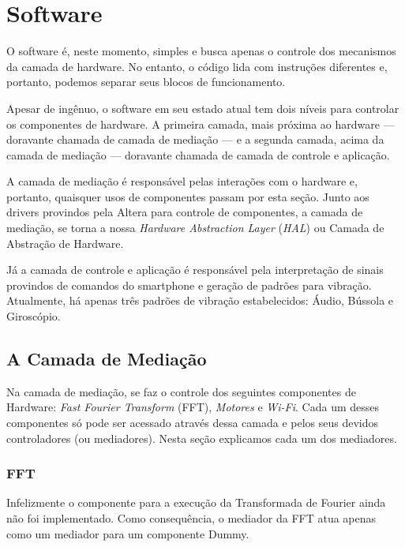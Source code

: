 \documentclass{sig-alternate-05-2015}
\begin{document}
\section{Software}
\label{sec:SW}

    O software é, neste momento, simples e busca apenas o controle dos
    mecanismos da camada de hardware. No entanto, o código lida com instruções
    diferentes e, portanto, podemos separar seus blocos de funcionamento.
    
    Apesar de ingênuo, o software em seu estado atual tem dois níveis para
    controlar os componentes de hardware. A primeira camada, mais próxima ao
    hardware — doravante chamada de camada de mediação — e a segunda camada,
    acima da camada de mediação — doravante chamada de camada de controle e
    aplicação.

    A camada de mediação é responsável pelas interações com o hardware e,
    portanto, quaisquer usos de componentes passam por esta seção. Junto aos
    drivers provindos pela Altera\cite{downloadCenter} para controle de
    componentes, a camada de mediação, se torna a nossa \textit{Hardware
    Abstraction Layer} (\textit{HAL}) ou Camada de Abstração de Hardware.

    Já a camada de controle e aplicação é responsável pela interpretação de
    sinais provindos de comandos do smartphone e geração de padrões para
    vibração. Atualmente, há apenas três padrões de vibração estabelecidos:
    Áudio, Bússola e Giroscópio.
    
    \subsection{A Camada de Mediação}
        Na camada de mediação, se faz o controle dos seguintes componentes de
        Hardware: \textit{Fast Fourier Transform} (FFT), \textit{Motores} e
        \textit{Wi-Fi}. Cada um desses componentes só pode ser acessado através
        dessa camada e pelos seus devidos controladores (ou mediadores). Nesta
        seção explicamos cada um dos mediadores.
        \subsubsection{FFT}
        \label{sec:FFT}
            Infelizmente o componente para a execução da Transformada de
            Fourier ainda não foi implementado. Como consequência, o mediador
            da FFT atua apenas como um mediador para um componente Dummy.
            
\end{document}
